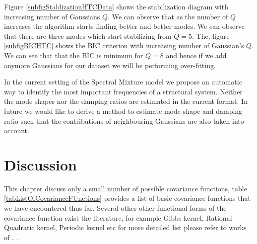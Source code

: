 Figure \ref{subfigStablizationHTCData} shows the stabilization diagram with increasing number of Gaussians $Q$. We can observe that as the number of $Q$ increases the algorithm starts finding better and better modes. We can observe that there are three modes which start stabilizing from $Q=5$. The, figure \ref{subfigBICHTC} shows the BIC criterion with increasing number of Gaussian's $Q$. We can see that that the BIC is minimum for $Q=8$ and hence if we add anymore Gaussians for our dataset we will be performing over-fitting. 

In the current setting of the Spectral Mixture model we propose an automatic way to identify the most important frequencies of a structural system. Neither the mode shapes nor the damping ratios are estimated in the current format. In future we would like to derive a method to estimate mode-shape and damping ratio such that the contributions of neighbouring Gaussians are also taken into account. 

\section{Discussion}
This chapter discuss only a small number of possible covariance functions, table \ref{tabListOfCovarianceFUnctions} provides a list of basic covariance functions that we have encountered thus far. Several other other functional forms of the covariance function exist the literature, for example Gibbs kernel, Rational Quadratic kernel, Periodic kernel etc for more detailed list please refer to works of \cite{Rasmussen2005, duvenaud2013structure, wilson2014thesis}. . 


